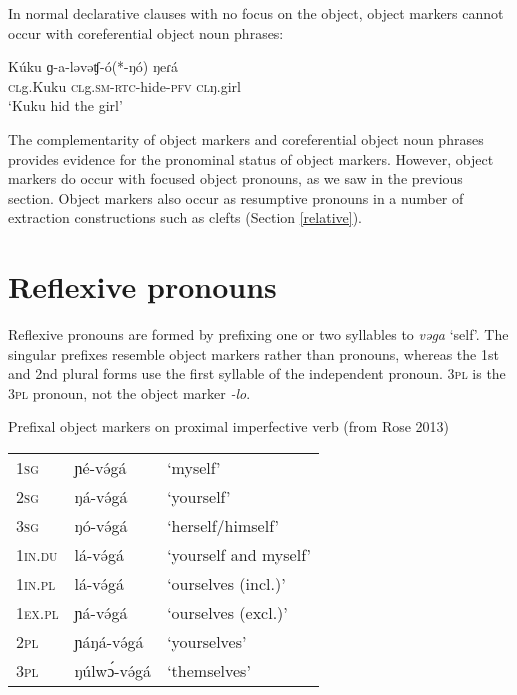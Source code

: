 In normal declarative clauses with no focus on the object, object markers cannot occur with coreferential object noun phrases:

\ea	\gll	Kúku        ɡ-a-ləvəʧ-ó(*-ŋó)	        ŋeɾá		 \\
			\textsc{cl}g.Kuku   \textsc{cl}g.\textsc{sm}-\textsc{rtc}-hide-\textsc{pfv}   \textsc{cl}ŋ.girl	 \\
	\glt		‘Kuku hid the girl’				
\z

The complementarity of object markers and coreferential object noun phrases  provides evidence for the pronominal status of object markers. However, object markers do occur with focused object pronouns, as we saw in the previous section. Object markers also occur as resumptive pronouns in a number of extraction constructions such as clefts (Section \ref{relative}).

\section{Reflexive pronouns}

Reflexive pronouns are formed by prefixing one or two syllables to \textit{vəga} ‘self’. The singular prefixes resemble object markers rather than pronouns, whereas the 1st and 2nd plural forms use the first syllable of the independent pronoun. 3\textsc{pl} is the 3\textsc{pl} pronoun, not the object marker \textit{-lo}. %

\ea Prefixal object markers on proximal imperfective verb (from Rose 2013)\\
\begin{tabular}[t]{lll}
1\textsc{sg} & ɲé-və́gá	 & `myself'\\
2\textsc{sg} &  ŋá-və́gá	 & `yourself'\\
3\textsc{sg} &  ŋó-və́gá	 & `herself/himself'\\
1\textsc{in}.\textsc{du} & lá-və́gá	& `yourself and myself'\\
1\textsc{in}.\textsc{pl} & lá-və́gá  & `ourselves (incl.)'\\
1\textsc{ex}.\textsc{pl} & ɲá-və́gá & `ourselves (excl.)'\\
2\textsc{pl} & ɲáŋá-və́gá	 & `yourselves'\\
3\textsc{pl} & ŋúlwɔ́-və́gá & `themselves'\\
\end{tabular}
\z

